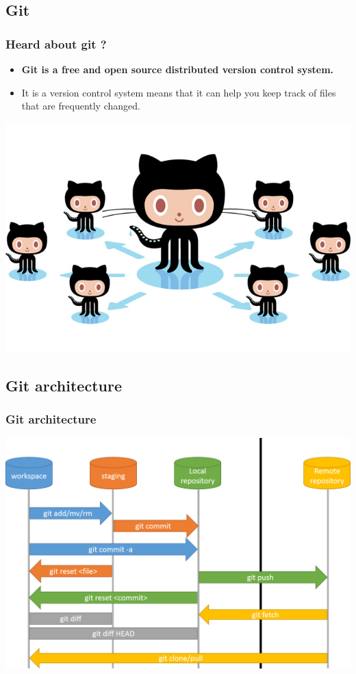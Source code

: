 \documentclass{beamer}
\begin{document}
\subsection{Git} %

\begin{frame}
\frametitle{Heard about git ?}
\begin{itemize}
 \item \textbf{Git is a free and open source distributed version control system.}
 \item It is a version control system means that it can help you keep track of files that are frequently changed.
\end{itemize}
\begin{center}
  \includegraphics[scale=0.25]{socialite.jpg}
\end{center}
\end{frame}
\subsection{Git architecture}
\begin{frame}
\frametitle{Git architecture}
  \includegraphics[scale=0.4]{git-remote.png}
\end{frame}
\end{document}

